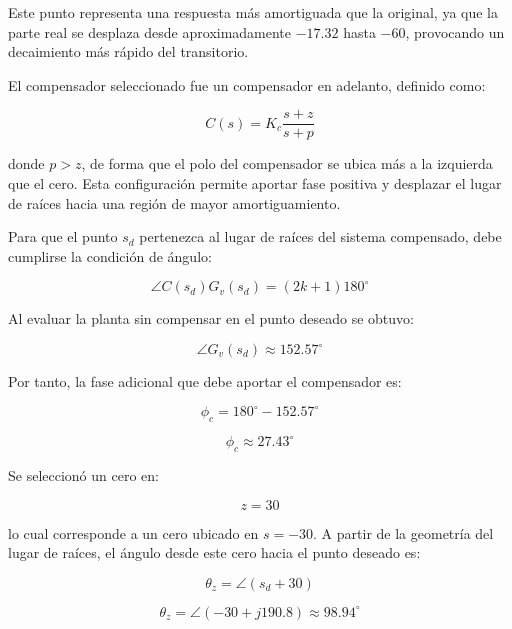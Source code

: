 \documentclass[journal]{IEEEtran}
\begin{document}
Este punto representa una respuesta más amortiguada que la original, ya que la parte real se desplaza desde aproximadamente $-17.32$ hasta $-60$, provocando un decaimiento más rápido del transitorio.

El compensador seleccionado fue un compensador en adelanto, definido como:

\begin{equation}
C(s)=K_c\frac{s+z}{s+p}
\end{equation}

donde $p>z$, de forma que el polo del compensador se ubica más a la izquierda que el cero. Esta configuración permite aportar fase positiva y desplazar el lugar de raíces hacia una región de mayor amortiguamiento.

Para que el punto $s_d$ pertenezca al lugar de raíces del sistema compensado, debe cumplirse la condición de ángulo:

\begin{equation}
\angle C(s_d)G_v(s_d)=(2k+1)180^\circ
\end{equation}

Al evaluar la planta sin compensar en el punto deseado se obtuvo:

\begin{equation}
\angle G_v(s_d) \approx 152.57^\circ
\end{equation}

Por tanto, la fase adicional que debe aportar el compensador es:

\begin{equation}
\phi_c = 180^\circ - 152.57^\circ
\end{equation}

\begin{equation}
\phi_c \approx 27.43^\circ
\end{equation}

Se seleccionó un cero en:

\begin{equation}
z=30
\end{equation}

lo cual corresponde a un cero ubicado en $s=-30$. A partir de la geometría del lugar de raíces, el ángulo desde este cero hacia el punto deseado es:

\begin{equation}
\theta_z=\angle(s_d+30)
\end{equation}

\begin{equation}
\theta_z=\angle(-30+j190.8)\approx 98.94^\circ
\end{equation}
\end{document}
